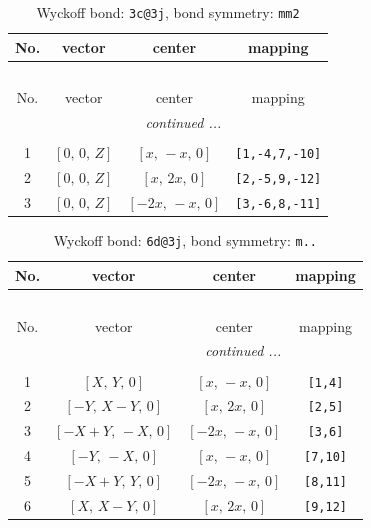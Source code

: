 \documentclass[fleqn,8pt]{jsarticle}
\begin{document}
\renewcommand{\arraystretch}{1.2}
\begin{longtable}{cccc}
\caption{Wyckoff bond: {\tt 3c@3j}, bond symmetry: {\tt mm2}}
 \\
 \hline \hline
No. & vector & center & mapping \\ \hline \endfirsthead

\multicolumn{3}{l}{\tablename\ \thetable{}} \\
 \hline \hline
No. & vector & center & mapping \\ \hline \endhead

 \hline \hline
\multicolumn{3}{r}{\footnotesize\it continued ...} \\ \endfoot

 \hline \hline
\multicolumn{3}{r}{} \\ \endlastfoot

1 & $\left[ 0,\, 0,\, Z \right]$ & $\left[ x,\, - x,\, 0 \right]$ & {\tt [1,-4,7,-10]} \\ \hline
2 & $\left[ 0,\, 0,\, Z \right]$ & $\left[ x,\, 2 x,\, 0 \right]$ & {\tt [2,-5,9,-12]} \\ \hline
3 & $\left[ 0,\, 0,\, Z \right]$ & $\left[ - 2 x,\, - x,\, 0 \right]$ & {\tt [3,-6,8,-11]} \\
\end{longtable}
\renewcommand{\arraystretch}{1.2}
\begin{longtable}{cccc}
\caption{Wyckoff bond: {\tt 6d@3j}, bond symmetry: {\tt m..}}
 \\
 \hline \hline
No. & vector & center & mapping \\ \hline \endfirsthead

\multicolumn{3}{l}{\tablename\ \thetable{}} \\
 \hline \hline
No. & vector & center & mapping \\ \hline \endhead

 \hline \hline
\multicolumn{3}{r}{\footnotesize\it continued ...} \\ \endfoot

 \hline \hline
\multicolumn{3}{r}{} \\ \endlastfoot

1 & $\left[ X,\, Y,\, 0 \right]$ & $\left[ x,\, - x,\, 0 \right]$ & {\tt [1,4]} \\ \hline
2 & $\left[ - Y,\, X - Y,\, 0 \right]$ & $\left[ x,\, 2 x,\, 0 \right]$ & {\tt [2,5]} \\ \hline
3 & $\left[ - X + Y,\, - X,\, 0 \right]$ & $\left[ - 2 x,\, - x,\, 0 \right]$ & {\tt [3,6]} \\ \hline
4 & $\left[ - Y,\, - X,\, 0 \right]$ & $\left[ x,\, - x,\, 0 \right]$ & {\tt [7,10]} \\ \hline
5 & $\left[ - X + Y,\, Y,\, 0 \right]$ & $\left[ - 2 x,\, - x,\, 0 \right]$ & {\tt [8,11]} \\ \hline
6 & $\left[ X,\, X - Y,\, 0 \right]$ & $\left[ x,\, 2 x,\, 0 \right]$ & {\tt [9,12]} \\
\end{longtable}
\end{document}
